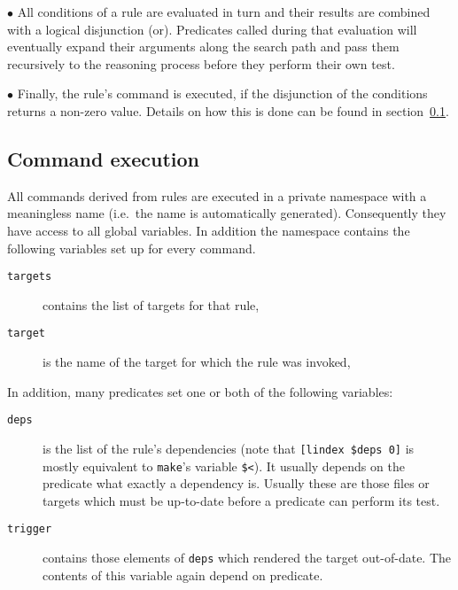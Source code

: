 \documentclass[11pt]{scrartcl}
\newcommand{\bras}{\texttt{bras}}
\newcommand{\make}{\texttt{make}}
\begin{document}
$\bullet$ All conditions of a rule are evaluated in turn and their
results are combined with a logical disjunction (or). Predicates
called during that evaluation will eventually expand their arguments
along the search path and pass them recursively to the reasoning
process before they perform their own test.

$\bullet$ Finally, the rule's command is executed, if the disjunction
of the conditions returns a non-zero value. Details on how this is
done can be found in section~\ref{secCmdExec}.


\subsection{Command execution}
\label{secCmdExec}

All commands derived from rules are executed in a private namespace
with a meaningless name (i.e.\ the name is automatically
generated). Consequently they have access to all global variables. In
addition the namespace contains the following variables set up for
every command.

\begin{description}
\item[\texttt{targets}] contains the list of targets for that rule,
\item[\texttt{target}] is the name of the target for which the rule
  was invoked,
\end{description}

In addition, many predicates set one or both of the following
variables: 
\begin{description}
\item[\texttt{deps}] is the list of the rule's dependencies (note that
  \texttt{[lindex \$deps 0]} is mostly equivalent to \make's variable
  \texttt{\$<}). It usually depends on the predicate what exactly a
  dependency is. Usually these are those files or targets which must
  be up-to-date before a predicate can perform its test.
\item[\texttt{trigger}] contains those elements of \texttt{deps} which
  rendered the target out-of-date. The contents of this variable
  again depend on predicate.
\end{description}
\end{document}

